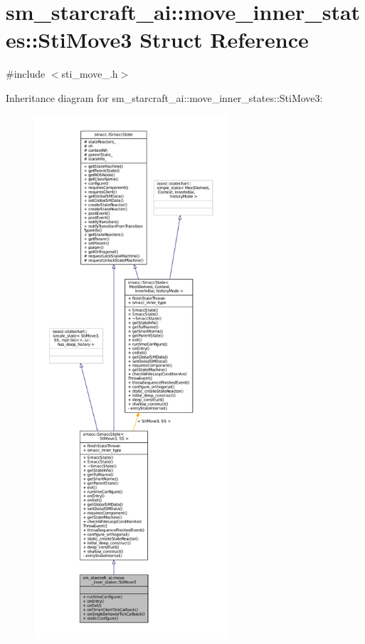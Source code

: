 \hypertarget{structsm__starcraft__ai_1_1move__inner__states_1_1StiMove3}{}\section{sm\+\_\+starcraft\+\_\+ai\+:\+:move\+\_\+inner\+\_\+states\+:\+:Sti\+Move3 Struct Reference}
\label{structsm__starcraft__ai_1_1move__inner__states_1_1StiMove3}


{\ttfamily \#include $<$sti\+\_\+move\+\_.\+h$>$}



Inheritance diagram for sm\+\_\+starcraft\+\_\+ai\+:\+:move\+\_\+inner\+\_\+states\+:\+:Sti\+Move3\+:
\nopagebreak
\begin{figure}[H]
\begin{center}
\leavevmode
\includegraphics[height=550pt]{structsm__starcraft__ai_1_1move__inner__states_1_1StiMove3__inherit__graph}
\end{center}
\end{figure}


